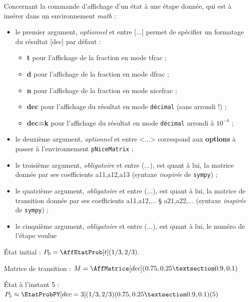 \documentclass[french,a4paper,11pt]{article}
\newcommand\Cle[1]{{\bfseries\sffamily\textlangle #1\textrangle}}
\begin{document}
\begin{tipblock}
Concernant la commande d'affichage d'un état à une étape donnée, qui est à insérer dans un environnement \textit{math} :

\begin{itemize}
	\item le premier argument, \textit{optionnel} et entre \textsf{[...]} permet de spécifier un formatage du résultat \textsf{[dec] par défaut} :
	\begin{itemize}
		\item \Cle{t} pour l'affichage de la fraction en mode \textsf{tfrac} ;
		\item \Cle{d} pour l'affichage de la fraction en mode \textsf{dfrac} ;
		\item \Cle{n} pour l'affichage de la fraction en mode \textsf{nicefrac} ;
		\item \Cle{dec} pour l'affichage du résultat en mode \texttt{décimal} (sans arrondi !) ;
		\item \Cle{dec=k} pour l'affichage du résultat en mode \texttt{décimal} arrondi à $10^{-k}$ ;
	\end{itemize}
	\item le deuxième argument, \textit{optionnel} et entre \textsf{<...>} correspond aux \Cle{options} à passer à l'environnement \texttt{pNiceMatrix} ;
	\item le troisième argument, \textit{obligatoire} et entre \textsf{(...)}, est quant à lui, la matrice donnée par ses coefficients \textsf{a11,a12,a13} (syntaxe \textit{inspirée} de \texttt{sympy}) ;
	\item le quatrième argument, \textit{obligatoire} et entre \textsf{(...)}, est quant à lui, la matrice de transition donnée par ses coefficients \textsf{a11,a12,... § a21,a22,...} (syntaxe \textit{inspirée} de \texttt{sympy}) ;
	\item le cinquième argument, \textit{obligatoire} et entre \textsf{(...)}, est quant à lui, le numéro de l'étape voulue
\end{itemize}
\vspace*{-\baselineskip}\leavevmode
\end{tipblock}

\begin{PresentationCode}{}
État initial : $P_0 = \AffEtatProb[t](1/3,2/3)$.

Matrice de transition :
$M=\AffMatrice[dec](0.75,0.25 § 0.9,0.1)$

État à l'instant 5 :
$P_5 \approx \EtatProbPY[dec=3](1/3,2/3)%
	(0.75,0.25 § 0.9,0.1)
	(5)$
\end{PresentationCode}
\end{document}
